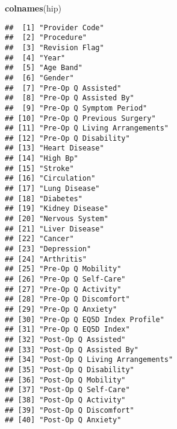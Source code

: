 \documentclass[
]{article}
\newenvironment{Shaded}{\begin{snugshade}}{\end{snugshade}}
\newcommand{\FunctionTok}[1]{\textcolor[rgb]{0.13,0.29,0.53}{\textbf{#1}}}
\newcommand{\NormalTok}[1]{#1}
\begin{document}
\begin{Shaded}
\begin{Highlighting}[]
\FunctionTok{colnames}\NormalTok{(hip)}
\end{Highlighting}
\end{Shaded}

\begin{verbatim}
##  [1] "Provider Code"                                 
##  [2] "Procedure"                                     
##  [3] "Revision Flag"                                 
##  [4] "Year"                                          
##  [5] "Age Band"                                      
##  [6] "Gender"                                        
##  [7] "Pre-Op Q Assisted"                             
##  [8] "Pre-Op Q Assisted By"                          
##  [9] "Pre-Op Q Symptom Period"                       
## [10] "Pre-Op Q Previous Surgery"                     
## [11] "Pre-Op Q Living Arrangements"                  
## [12] "Pre-Op Q Disability"                           
## [13] "Heart Disease"                                 
## [14] "High Bp"                                       
## [15] "Stroke"                                        
## [16] "Circulation"                                   
## [17] "Lung Disease"                                  
## [18] "Diabetes"                                      
## [19] "Kidney Disease"                                
## [20] "Nervous System"                                
## [21] "Liver Disease"                                 
## [22] "Cancer"                                        
## [23] "Depression"                                    
## [24] "Arthritis"                                     
## [25] "Pre-Op Q Mobility"                             
## [26] "Pre-Op Q Self-Care"                            
## [27] "Pre-Op Q Activity"                             
## [28] "Pre-Op Q Discomfort"                           
## [29] "Pre-Op Q Anxiety"                              
## [30] "Pre-Op Q EQ5D Index Profile"                   
## [31] "Pre-Op Q EQ5D Index"                           
## [32] "Post-Op Q Assisted"                            
## [33] "Post-Op Q Assisted By"                         
## [34] "Post-Op Q Living Arrangements"                 
## [35] "Post-Op Q Disability"                          
## [36] "Post-Op Q Mobility"                            
## [37] "Post-Op Q Self-Care"                           
## [38] "Post-Op Q Activity"                            
## [39] "Post-Op Q Discomfort"                          
## [40] "Post-Op Q Anxiety"                             

\end{verbatim}
\end{document}
